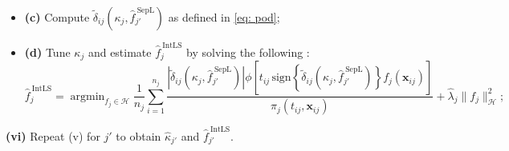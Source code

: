 \documentclass[12pt]{article}
\DeclareMathOperator*{\argmin}{argmin}
\begin{document}
\begin{algorithm}[h]
\begin{algorithmic}
\begin{itemize}
    \item[] \textbf{(c)} Compute $\widetilde{\delta}_{ij}\left(\kappa_j, \widehat{f}_{j'}^{\ \text{SepL}}\right)$ as defined in \eqref{eq: pod};
    \item[] \textbf{(d)} Tune $\kappa_j$ and estimate  $\widehat{f}_j^{\ \text{IntLS}}$ by solving the following :
    \[
    \widehat{f}_j^{\ \text{IntLS}} = \argmin_{f_j \in \mathcal{H}} \frac{1}{n_j} \sum_{i=1}^{n_j} \frac{\left|\widetilde{\delta}_{ij}\left(\kappa_j, \widehat{f}_{j'}^{\ \text{SepL}}\right)\right| \phi\left[t_{ij} \, \text{sign}\left\{\widetilde{\delta}_{ij}\left(\kappa_j, \widehat{f}_{j'}^{\ \text{SepL}}\right)\right\} f_j(\boldsymbol{x}_{ij})\right]}{\pi_j(t_{ij}, \boldsymbol{x}_{ij})} + \widehat{\lambda}_j \|f_j\|_{\mathcal{H}}^2;
    \]
\end{itemize}
\State \textbf{(vi)} Repeat (v) for $j'$ to obtain $\widehat{\kappa}_{j'}$ and $\widehat{f}_{j'}^{\ \text{IntLS}}$.
\end{algorithmic}
\end{algorithm}
\end{document}
